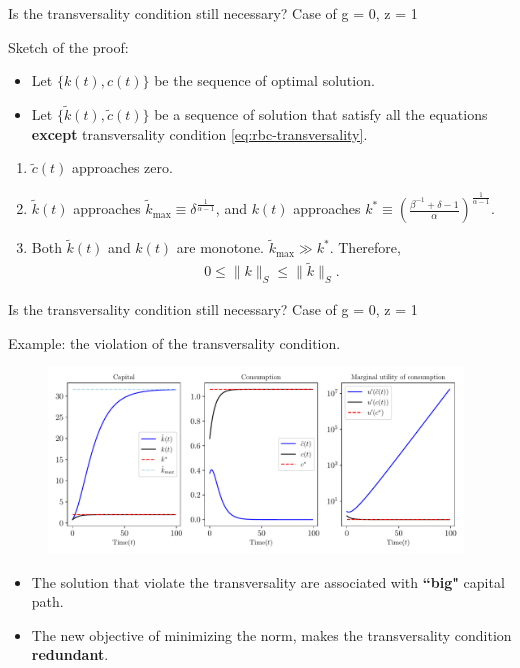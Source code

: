 \documentclass[aspectratio=169,10pt]{beamer}
\newcommand{\emphcolor}[1]{\textbf{\textcolor{emphcolorval}{#1}}}
\begin{document}
\begin{frame}[label = NCG_Minnorm]{Is the transversality condition still necessary? Case of g = 0, z = 1 }
	
	Sketch of the proof:
	\begin{itemize}
		\item Let $\{k(t),c(t)\}$ be the sequence of optimal solution.
		\item Let $\{\tilde{k}(t),\tilde{c}(t)\}$ be a sequence of solution that satisfy all the equations \emphcolor{except} transversality condition \cref{eq:rbc-transversality}.
	\end{itemize}
	
	\begin{enumerate}
		\item $\tilde{c}(t)$ approaches zero.
		\item $\tilde{k}(t)$ approaches $\tilde{k}_{\text{max}}\equiv\delta^{\frac{1}{\alpha-1}}$, and $k(t)$ approaches $k^*\equiv \left(\frac{\beta^{-1}+\delta-1}{\alpha}\right)^{\frac{1}{\alpha-1}}$. 
		\item Both $\tilde{k}(t)$ and $k(t)$ are monotone. $\tilde{k}_{\text{max}} \gg k^*$. Therefore,
		\begin{align*}
			0 \leq \|k\|_S \leq \|\tilde{k}\|_S.
		\end{align*}
	\end{enumerate}
	
	
\end{frame}

\begin{frame}[label =TVC_Examples]{Is the transversality condition still necessary? Case of g = 0, z = 1 }
	
	Example: the violation of the transversality condition.
	\begin{figure}[htb]
		\centering
		\includegraphics[width=11cm]{./figures/growth_sequential_violating_tvc_paths_below.pdf}
	\end{figure}
	
	\begin{itemize}
		\item The solution that violate the transversality are associated with \emphcolor{``big"} capital path.
		\item The new objective of minimizing the norm, makes the transversality condition \emphcolor{redundant}.
	\end{itemize}
	

\end{frame}
\end{document}
